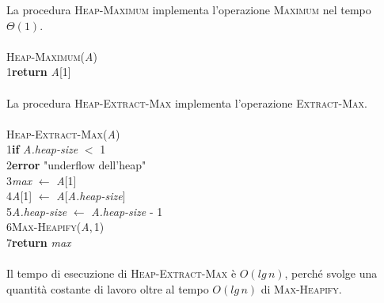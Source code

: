 \documentclass[10pt, a4paper]{report}
\newcommand\firsttab[1][0.5cm]{\hspace*{#1}}
\newcommand\secondtab[1][1cm]{\hspace*{#1}}
\begin{document}
La procedura \textsc{Heap-Maximum} implementa l'operazione \textsc{Maximum} nel tempo $\Theta(1)$.\\\\
\textsc{Heap-Maximum(\textit{A})}\\
1\firsttab\textbf{return} \textit{A}[1]\\\\
La procedura \textsc{Heap-Extract-Max} implementa l'operazione \textsc{Extract-Max}.\\\\
\textsc{Heap-Extract-Max(\textit{A})}\\
1\firsttab\textbf{if} \textit{A.heap-size} $<$ 1\\
2\secondtab\textbf{error} "underflow dell'heap"\\
3\firsttab\textit{max} $\leftarrow$ \textit{A}[1]\\
4\firsttab\textit{A}[1] $\leftarrow$ \textit{A}[\textit{A.heap-size}]\\
5\firsttab\textit{A.heap-size} $\leftarrow$ \textit{A.heap-size} - 1\\
6\firsttab\textsc{Max-Heapify(\textit{A},\,1)}\\
7\firsttab\textbf{return} \textit{max}\\\\
Il tempo di esecuzione di \textsc{Heap-Extract-Max} è $O(lg\,n)$, perché svolge una quantità costante di lavoro oltre al tempo $O(lg\,n)$ di \textsc{Max-Heapify}.
\end{document}
